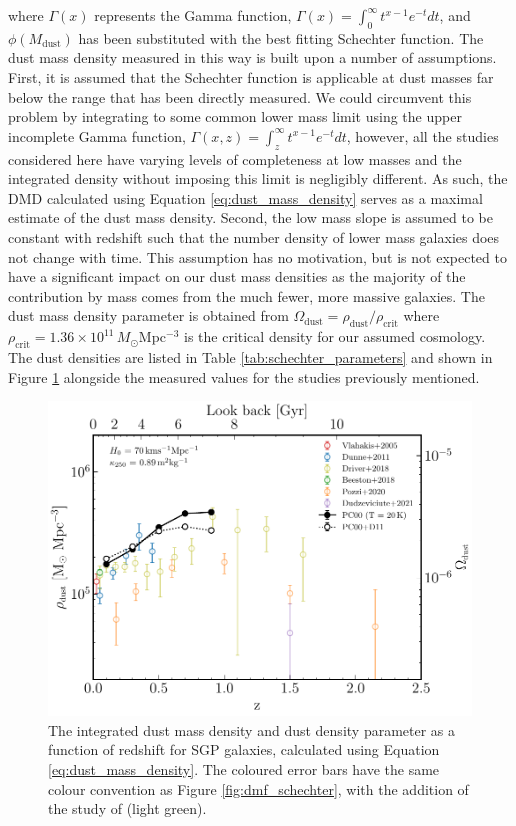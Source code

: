 \noindent where $\Gamma(x)$ represents the Gamma function, $\Gamma(x) = \int_0^\infty t^{x-1}e^{-t} dt$, and $\phi(M_{\textrm{dust}})$ has been substituted with the best fitting Schechter function. The dust mass density measured in this way is built upon a number of assumptions. First, it is assumed that the Schechter function is applicable at dust masses far below the range that has been directly measured. We could circumvent this problem by integrating to some common lower mass limit using the upper incomplete Gamma function, $\Gamma(x, z) = \int_z^\infty t^{x-1}e^{-t} dt$, however, all the studies considered here have varying levels of completeness at low masses and the integrated density without imposing this limit is negligibly different. As such, the DMD calculated using Equation \ref{eq:dust_mass_density} serves as a maximal estimate of the dust mass density. Second, the low mass slope is assumed to be constant with redshift such that the number density of lower mass galaxies does not change with time. This assumption has no motivation, but is not expected to have a significant impact on our dust mass densities as the majority of the contribution by mass comes from the much fewer, more massive galaxies. The dust mass density parameter is obtained from $\Omega_{\textrm{dust}} = \rho_{\textrm{dust}}/\rho_{\textrm{crit}}$ where $\rho_{\textrm{crit}} = 1.36\times10^{11}\,M_{\odot}$Mpc$^{-3}$ is the critical density for our assumed cosmology. The dust densities are listed in Table \ref{tab:schechter_parameters} and shown in Figure \ref{fig:dmd} alongside the measured values for the studies previously mentioned. 

\begin{figure}
	\centering
	\includegraphics[width=0.8\columnwidth]{Figures/Figure_3_8.pdf}
	\caption[Integrated dust mass density as a function of redshift]{The integrated dust mass density and dust density parameter as a function of redshift for SGP galaxies, calculated using Equation \ref{eq:dust_mass_density}. The coloured error bars have the same colour convention as Figure \ref{fig:dmf_schechter}, with the addition of the study of \citealt{Driver_2018} (light green).}
	\label{fig:dmd}
\end{figure}

